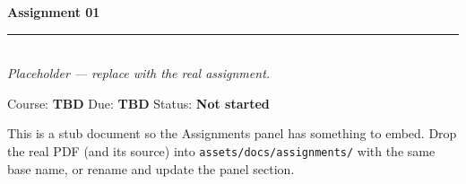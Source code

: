 \documentclass[11pt]{article}
\begin{document}
\begin{center}
  {\Large\bfseries Assignment 01 \\[2pt]}
  {\color{forgeamber}\rule{0.4\linewidth}{1pt}}\\[8pt]
  {\itshape Placeholder — replace with the real assignment.}
\end{center}
\vspace{1em}
\noindent Course: \textbf{TBD} \hfill Due: \textbf{TBD} \hfill Status: \textbf{Not started}
\vspace{1em}

\noindent This is a stub document so the Assignments panel has something to embed.
Drop the real PDF (and its source) into \texttt{assets/docs/assignments/} with the
same base name, or rename and update the panel section.
\end{document}
